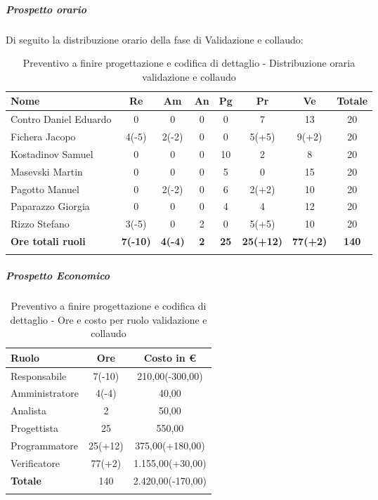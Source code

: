 \documentclass[../piano_di_progetto.tex]{subfiles}
\begin{document}
\subparagraph*{Prospetto orario}
Di seguito la distribuzione orario della fase di Validazione e collaudo:
\begin{center}
	\begin{longtable}{|l|c|c|c|c|c|c|c|}
		\hline
		\rowcolor{lightgray}
		\textbf{Nome} & \textbf{Re} & \textbf{Am} & \textbf{An} & \textbf{Pg}  & \textbf{Pr}   & \textbf{Ve} & \textbf{Totale} \\

		\hline
			Contro Daniel Eduardo & 0 & 0 & 0 & 0 & 7 & 13 & 20\\
			Fichera Jacopo & 4(-5) & 2(-2) & 0 & 0 & 5(+5) & 9(+2) & 20 \\ 
			Kostadinov Samuel & 0 & 0 & 0 & 10 & 2 & 8 & 20 \\ 		
			Masevski Martin & 0 & 0 & 0 & 5 & 0 & 15 & 20 \\
			Pagotto Manuel & 0 & 2(-2) & 0 & 6 & 2(+2) & 10 & 20 \\			
			Paparazzo Giorgia & 0 & 0 & 0 & 4 & 4 & 12 & 20 \\
			Rizzo Stefano & 3(-5) & 0 & 2 & 0 & 5(+5) & 10 & 20 \\
			\hline
			\textbf{Ore totali ruoli} & \textbf{7(-10)} & \textbf{4(-4)} & \textbf{2} & \textbf{25} & \textbf{25(+12)} & \textbf{77(+2)} & \textbf{140} \\
			\hline
		\rowcolor{white}
		\caption{Preventivo a finire progettazione e codifica di dettaglio - Distribuzione oraria validazione e collaudo}
	\end{longtable}
\end{center}


\subparagraph*{Prospetto Economico}

\begin{center}
	\begin{longtable}{|l|c|c|}
		\hline
		\rowcolor{lightgray}
		\textbf{Ruolo} & \textbf{Ore} & \textbf{Costo in €}\\

		\hline
		Responsabile & 7(-10) & 210,00(-300,00)\\
		Amministratore & 4(-4) & 40,00\\
		Analista & 2 & 50,00\\
		Progettista & 25 & 550,00\\
		Programmatore & 25(+12) & 375,00(+180,00)\\
		Verificatore & 77(+2) & 1.155,00(+30,00)\\
		\hline
		\textbf{Totale} & 140 & 2.420,00(-170,00)\\
		\hline
		\rowcolor{white}
		\caption{Preventivo a finire progettazione e codifica di dettaglio - Ore e costo per ruolo validazione e collaudo}
	\end{longtable}
\end{center}
\end{document}
